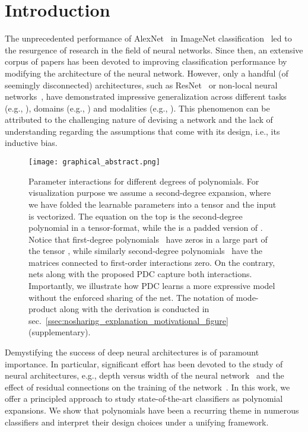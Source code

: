 \documentclass[runningheads]{llncs}
\newcommand{\resnet}{ResNet}
\newcommand{\noshare}{PDC}
\providecommand\eg{e.g.,}
\begin{document}
\section{Introduction}
\label{sec:intro}

The unprecedented performance of AlexNet~\cite{krizhevsky2012imagenet} in ImageNet classification~\cite{russakovsky2015imagenet} led to the resurgence of research in the field of neural networks. 
Since then, an extensive corpus of papers has been devoted to improving classification performance by modifying the architecture of the neural network. 
However, only a handful (of seemingly disconnected) architectures, such as \resnet~\cite{he2015deep} or non-local neural networks~\cite{wang2018non}, have demonstrated impressive generalization across different tasks (\eg{} \cite{zhang2018self}), domains (\eg{} \cite{won2019toward}) and modalities (\eg{} \cite{kim2018bilinear}). This phenomenon can be attributed to the challenging nature of devising a network and the lack of understanding regarding the assumptions that come with its design, i.e., its inductive bias. 

\begin{figure}[t!]
  \centering
    \texttt{[image: graphical\_abstract.png]}
  \caption{Parameter interactions for different degrees of polynomials. For visualization purpose we assume a second-degree expansion, where we have folded the learnable parameters into a tensor  and the input is vectorized. The equation on the top is the second-degree polynomial in a tensor-format, while the  is a padded version of . Notice that first-degree polynomials~\cite{he2015deep, krizhevsky2012imagenet, simonyan2014very} have zeros in a large part of the tensor , while similarly second-degree polynomials~\cite{hu2018squeeze,li2019selective} have the matrices connected to first-order interactions zero. On the contrary, nets along with the proposed \noshare{} capture both interactions. Importantly, we illustrate how \noshare{} learns a more expressive model without the enforced sharing of the net. The notation of mode- product along with the derivation is conducted in sec.~\ref{ssec:nosharing_explanation_motivational_figure} (supplementary).}
  \label{fig:graphical_abstract}
\end{figure}

Demystifying the success of deep neural architectures is of paramount importance. 
In particular, significant effort has been devoted to the study of neural architectures, \eg{} depth versus width of the neural network~\cite{rolnick2017power, hanin2019universal} and the effect of residual connections on the training of the network~\cite{hardt2016identity, huang2017densely, he2015deep}. In this work, we offer a principled approach to study state-of-the-art classifiers as polynomial expansions. We show that polynomials have been a recurring theme in numerous classifiers and interpret their design choices under a unifying framework. 
\end{document}
